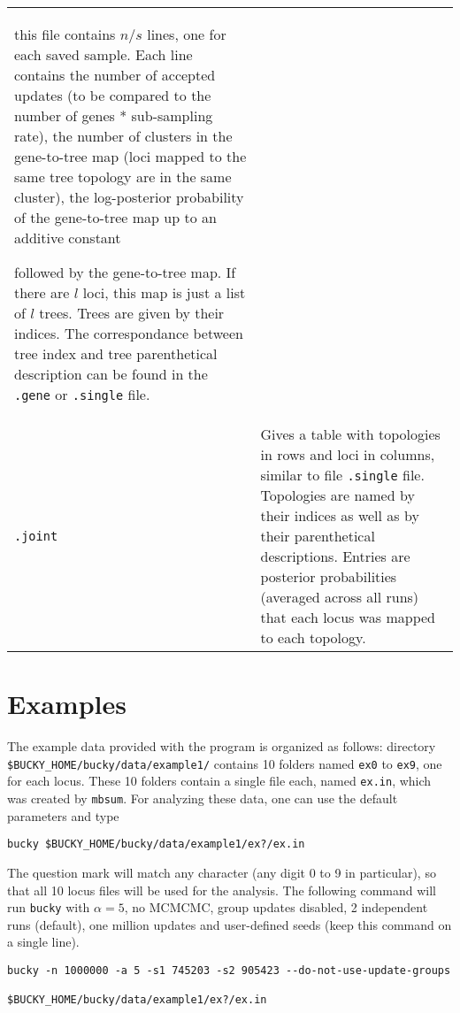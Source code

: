 \documentclass[12pt,english,final,letterpaper]{article}
\newcommand{\com}[1]{}
\begin{document}
\begin{tabular}{l|p{5.1in}}
this file contains $n/s$ lines, one for each saved sample. Each line contains 
the number of accepted updates (to be compared to the number of genes * 
sub-sampling rate), 
the number of clusters in the gene-to-tree map (loci mapped to the same 
tree topology are in the same cluster), 
the log-posterior probability of the gene-to-tree map 
up to an additive constant
\com{fixit: NOT sure at all. Bret: please check!}
followed by the gene-to-tree map. If there are $l$ loci, this map is just 
a list of $l$ trees. Trees are given by their indices. The correspondance
between tree index and tree parenthetical description can be found in the
{\tt .gene} or {\tt .single} file.\\
%
{\tt .joint}&Gives a table with topologies in rows and loci in columns,
similar to file {\tt .single} file. Topologies are 
named by their indices as well as by their parenthetical descriptions. 
Entries are posterior probabilities (averaged across all runs) 
that each locus was mapped to each topology.\\ 
\end{tabular}

\section{Examples}

The example data provided with the program is organized as follows:
directory\\ \verb+$BUCKY_HOME/bucky/data/example1/+ %
contains 10 folders named {\tt ex0} to {\tt ex9}, one for each locus. 
These 10 folders contain a single file each, named {\tt ex.in}, which was 
created by  {\tt mbsum}. For analyzing these data, one
can use the default parameters and type
\begin{verbatim}
bucky $BUCKY_HOME/bucky/data/example1/ex?/ex.in
\end{verbatim}%
The question mark will match any character (any digit 0 to 9 in
particular), so that all 10 locus files will be used for the analysis.
The following command will run {\tt bucky} with 
$\alpha=5$, no MCMCMC, group updates disabled, 2 independent runs (default), 
one million updates and user-defined seeds (keep this command on a single line).

\begin{verbatim}
bucky -n 1000000 -a 5 -s1 745203 -s2 905423 --do-not-use-update-groups 
                                    $BUCKY_HOME/bucky/data/example1/ex?/ex.in
\end{verbatim}
\end{document}
